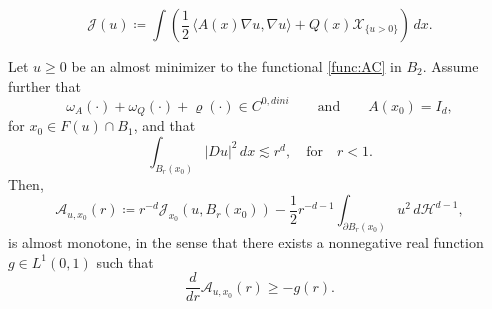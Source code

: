 \documentclass[10pt,a4paper]{amsart}
\begin{document}
\begin{equation}\label{func:AC}
    \mathcal J(u) \coloneqq \int \left( \frac{1}{2} \, \langle A(x)\nabla u, \nabla u \rangle + Q(x)\mathcal{X}_{\{u>0\}}\right)\,dx.
\end{equation}

\begin{theorem}\label{thm : almost mon formula}
Let $u \geq 0$ be an almost minimizer to the functional \eqref{func:AC} in $B_2$. Assume further that
\[
	\omega_A(\cdot) + \omega_Q(\cdot) + \varrho(\cdot) \in C^{0,dini} \qquad \text{and} \qquad A(x_0) = I_d,
\]
for $x_0 \in F(u)\cap B_1$, and that
\[
	\int_{B_r(x_0)} |Du|^2\,dx \lesssim r^d, \quad \text{for} \quad r<1.
\]  
Then,
\[
    \mathcal{A}_{u,x_0}(r) \coloneqq r^{-d}\mathcal{J}_{x_0}(u,B_r(x_0)) - \frac{1}{2}r^{-d - 1}\int_{\partial B_r(x_0)}u^2\, d\mathcal{H}^{d-1},
\]
is almost monotone, in the sense that there exists a nonnegative real function $g \in L^1(0,1)$ such that
$$
	\frac{d}{dr} \mathcal{A}_{u,x_0}(r) \geq -g(r).
$$
\end{theorem}
\end{document}
